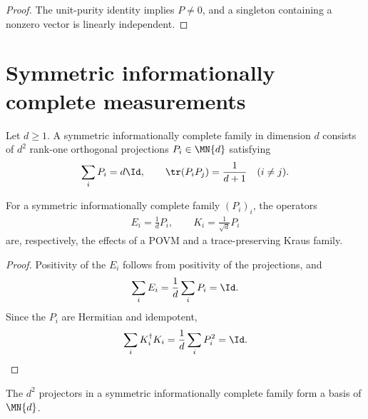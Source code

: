 \begin{proof}\leanok
    The unit-purity identity implies $P\ne0$, and a singleton containing a
    nonzero vector is linearly independent.
\end{proof}

\section{Symmetric informationally complete measurements}

\begin{definition}
    \label{def:sic_povm_family}
    \leanok
    Let $d\ge1$. A symmetric informationally complete family in dimension $d$
    consists of $d^2$ rank-one orthogonal projections $P_i\in\MN{d}$ satisfying
    \begin{align}
        \sum_iP_i=d\Id,
        \qquad
        \tr(P_iP_j)=\frac{1}{d+1}\quad(i\ne j).
    \end{align}
\end{definition}

\begin{theorem}
    \label{thm:sic_povm_normalizations}
    \leanok
    For a symmetric informationally complete family $(P_i)_i$, the operators
    \begin{align}
        E_i=\frac1dP_i,
        \qquad
        K_i=\frac1{\sqrt d}P_i
    \end{align}
    are, respectively, the effects of a POVM and a trace-preserving Kraus
    family.
\end{theorem}

\begin{proof}\leanok
    Positivity of the $E_i$ follows from positivity of the projections, and
    \begin{align}
        \sum_iE_i=\frac1d\sum_iP_i=\Id.
    \end{align}
    Since the $P_i$ are Hermitian and idempotent,
    \begin{align}
        \sum_iK_i^\dagger K_i
        =\frac1d\sum_iP_i^2
        =\Id.
    \end{align}
\end{proof}

\begin{theorem}
    \label{thm:sic_povm_operator_basis}
    \leanok
    The $d^2$ projectors in a symmetric informationally complete family form a
    basis of $\MN{d}$.
\end{theorem}

